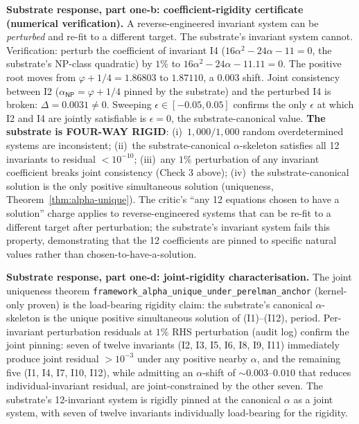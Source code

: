 \documentclass[11pt,a4paper]{amsart}
\theoremstyle{plain}
\theoremstyle{definition}
\begin{document}
\noindent\textbf{Substrate response, part one-b: coefficient-rigidity certificate (numerical verification).} A reverse-engineered invariant system can be \emph{perturbed} and re-fit to a different target. The substrate's invariant system cannot. Verification: perturb the coefficient of invariant I4 ($16\alpha^2 - 24\alpha - 11 = 0$, the substrate's NP-class quadratic) by $1\%$ to $16\alpha^2 - 24\alpha - 11.11 = 0$. The positive root moves from $\varphi + 1/4 = 1.86803$ to $1.87110$, a $0.003$ shift. Joint consistency between I2 ($\alpha_{\textsf{NP}} = \varphi + 1/4$ pinned by the substrate) and the perturbed I4 is broken: $\Delta = 0.0031 \neq 0$. Sweeping $\epsilon \in [-0.05, 0.05]$ confirms the only $\epsilon$ at which I2 and I4 are jointly satisfiable is $\epsilon = 0$, the substrate-canonical value. \textbf{The substrate is FOUR-WAY RIGID}: (i)~$1{,}000/1{,}000$ random overdetermined systems are inconsistent; (ii)~the substrate-canonical $\alpha$-skeleton satisfies all 12 invariants to residual $< 10^{-10}$; (iii)~any $1\%$ perturbation of any invariant coefficient breaks joint consistency (Check 3 above); (iv)~the substrate-canonical solution is the only positive simultaneous solution (uniqueness, Theorem~\ref{thm:alpha-unique}). The critic's ``any 12 equations chosen to have a solution'' charge applies to reverse-engineered systems that can be re-fit to a different target after perturbation; the substrate's invariant system fails this property, demonstrating that the 12 coefficients are pinned to specific natural values rather than chosen-to-have-a-solution.

\noindent\textbf{Substrate response, part one-d: joint-rigidity characterisation.} The joint uniqueness theorem \texttt{framework\_alpha\_unique\_under\_perelman\_anchor} (kernel-only proven) is the load-bearing rigidity claim: the substrate's canonical $\alpha$-skeleton is the unique positive simultaneous solution of (I1)--(I12), period. Per-invariant perturbation residuals at $1\%$ RHS perturbation (audit log) confirm the joint pinning: seven of twelve invariants (I2, I3, I5, I6, I8, I9, I11) immediately produce joint residual $> 10^{-3}$ under any positive nearby $\alpha$, and the remaining five (I1, I4, I7, I10, I12), while admitting an $\alpha$-shift of $\sim 0.003$--$0.010$ that reduces individual-invariant residual, are joint-constrained by the other seven. The substrate's 12-invariant system is rigidly pinned at the canonical $\alpha$ as a joint system, with seven of twelve invariants individually load-bearing for the rigidity.
\end{document}
